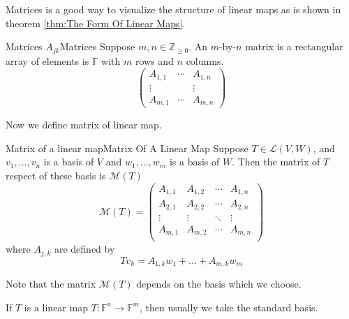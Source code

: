 \documentclass[../main.tex]{subfiles}
\begin{document}
Matrices is a good way to visualize the structure of linear maps as is shown in theorem \ref{thm:The Form Of Linear Maps}.

\begin{definition}{Matrices $A_{jk}$}{Matrices}
Suppose $m,n\in \mathbb{Z}_{\geq 0}$. An $m$-by-$n$ matrix is a rectangular array of elements is $\mathbb{F}$ with $m$ rows and $n$ columns.
\begin{equation*}
\begin{pmatrix}
	A_{1,1} & \cdots  & A_{1,n}\\
	\vdots  &  & \vdots \\
	A_{m,1} & \cdots  & A_{m,n}
\end{pmatrix}
\end{equation*}
\end{definition}

Now we define matrix of linear map.
\begin{definition}{Matrix of a linear map}{Matrix Of A Linear Map}
	Suppose $T\in \mathscr{L}(V,W)$, and $v_1, \ldots ,v_n$ is a basis of $V$ and $w_1, \ldots ,w_m$ is a basis of $W$. Then the matrix of $T$ respect of these basis is  $\mathscr{M}(T)$ 
	\begin{equation}
	\mathscr{M}(T) = 
	\begin{pmatrix}
	A_{1,1} & A_{1,2} & \cdots & A_{1,n} \\
	A_{2,1} & A_{2,2} & \cdots & A_{2,n} \\
	\vdots & \vdots & \ddots & \vdots \\
	A_{m,1} & A_{m,2} & \cdots & A_{m,n} \\
	\end{pmatrix}
	\end{equation}
	where $A_{j,k}$ are defined by
	\begin{equation}
	Tv_k = A_{1,k}w_1 +\ldots +A_{m,k}w_m
	\end{equation}
\end{definition}

\begin{remark}
Note that the matrix $\mathscr{M}(T)$ depends on the basis which we choose.

If $T$ is a linear map $T: \mathbb{F}^n \rightarrow \mathbb{F}^m$, then usually we take the standard basis.
\end{remark}
\end{document}
